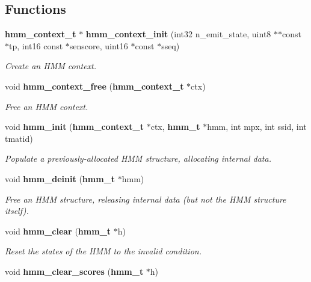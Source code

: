 \subsection*{Functions}
\begin{DoxyCompactItemize}
\item 
{\bf hmm\-\_\-context\-\_\-t} $\ast$ {\bf hmm\-\_\-context\-\_\-init} (int32 n\-\_\-emit\-\_\-state, uint8 $\ast$$\ast$const $\ast$tp, int16 const $\ast$senscore, uint16 $\ast$const $\ast$sseq)\label{hmm_8h_a4d6e2799cbe290112e8517adcab1b038}

\begin{DoxyCompactList}\small\item\em Create an H\-M\-M context. \end{DoxyCompactList}\item 
void {\bf hmm\-\_\-context\-\_\-free} ({\bf hmm\-\_\-context\-\_\-t} $\ast$ctx)
\begin{DoxyCompactList}\small\item\em Free an H\-M\-M context. \end{DoxyCompactList}\item 
void {\bf hmm\-\_\-init} ({\bf hmm\-\_\-context\-\_\-t} $\ast$ctx, {\bf hmm\-\_\-t} $\ast$hmm, int mpx, int ssid, int tmatid)\label{hmm_8h_aa911ae0d1c0eba562692fbeebca90d78}

\begin{DoxyCompactList}\small\item\em Populate a previously-\/allocated H\-M\-M structure, allocating internal data. \end{DoxyCompactList}\item 
void {\bf hmm\-\_\-deinit} ({\bf hmm\-\_\-t} $\ast$hmm)\label{hmm_8h_a7440ced1649225beb6816bf62481e08b}

\begin{DoxyCompactList}\small\item\em Free an H\-M\-M structure, releasing internal data (but not the H\-M\-M structure itself). \end{DoxyCompactList}\item 
void {\bf hmm\-\_\-clear} ({\bf hmm\-\_\-t} $\ast$h)
\begin{DoxyCompactList}\small\item\em Reset the states of the H\-M\-M to the invalid condition. \end{DoxyCompactList}\item 
void {\bf hmm\-\_\-clear\-\_\-scores} ({\bf hmm\-\_\-t} $\ast$h)\label{hmm_8h_a9561d7ffa1e61c99de2d2b900774152f}


\end{DoxyCompactItemize}
